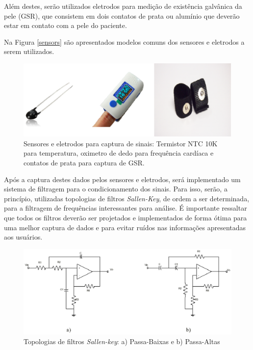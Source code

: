 Além destes, serão utilizados eletrodos para medição de existência galvânica 
da pele (GSR), 
que consistem em dois contatos de prata ou alumínio que deverão estar em contato com a pele do paciente.

Na Figura \ref{sensors} são apresentados modelos comuns dos sensores e eletrodos a serem utilizados.

\begin{figure}[H]
  \centering
    \includegraphics[width=\textwidth]{figuras/sensors.eps}
  \caption{Sensores e eletrodos para captura de sinais: Termistor NTC 10K para temperatura, oximetro de dedo para frequência cardíaca e contatos de prata para captura de GSR.}
  \label{fig:sensors}
\end{figure}

Após a captura destes dados pelos sensores e eletrodos, será implementado 
um sistema de filtragem para o condicionamento dos sinais. Para isso, serão, 
a princípio, utilizadas topologias de filtros \textit{Sallen-Key}, de ordem a ser determinada, 
para a filtragem de frequências interessantes para análise. É importante 
ressaltar que todos os filtros deverão ser projetados e implementados de forma 
ótima para uma melhor captura de dados e para evitar ruídos nas informações apresentadas aos usuários.

\begin{figure}[H]
  \centering
    \includegraphics[width=\textwidth]{figuras/sk.eps}
  \caption{Topologias de filtros \textit{Sallen-key}: a) Passa-Baixas e b) Passa-Altas}
  \label{fig:sk}
\end{figure}

